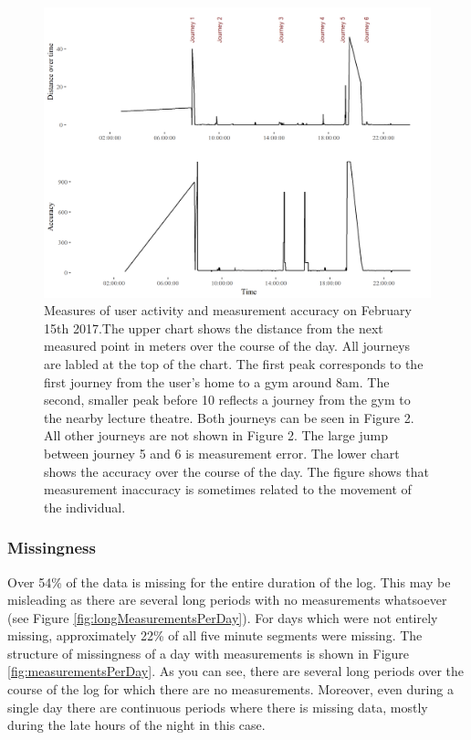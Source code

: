 \documentclass[english,man]{apa6}
\theoremstyle{definition}
\theoremstyle{definition}
\theoremstyle{definition}
\theoremstyle{remark}
\begin{document}
\begin{figure}
\includegraphics[width=1\linewidth]{img/accuracyLocShift} \caption{Measures of user activity and measurement accuracy on February 15th 2017.The upper chart shows the distance from the next measured point in meters over the course of the day. All journeys are labled at the top of the chart. The first peak corresponds to the first journey from the user's home to a gym around 8am. The second, smaller peak before 10 reflects a journey from the gym to the nearby lecture theatre. Both journeys can be seen in Figure 2. All other journeys are not shown in Figure 2. The large jump between journey 5 and 6 is measurement error. The lower chart shows the accuracy over the course of the day. The figure shows that measurement inaccuracy is sometimes related to the movement of the individual.}\label{fig:accuracyPlot2}
\end{figure}

\subsubsection{Missingness}\label{missingness}

Over 54\% of the data is missing for the entire duration of the log.
This may be misleading as there are several long periods with no
measurements whatsoever (see Figure \ref{fig:longMeasurementsPerDay}).
For days which were not entirely missing, approximately 22\% of all five
minute segments were missing. The structure of missingness of a day with
measurements is shown in Figure \ref{fig:measurementsPerDay}. As you can
see, there are several long periods over the course of the log for which
there are no measurements. Moreover, even during a single day there are
continuous periods where there is missing data, mostly during the late
hours of the night in this case.
\end{document}
